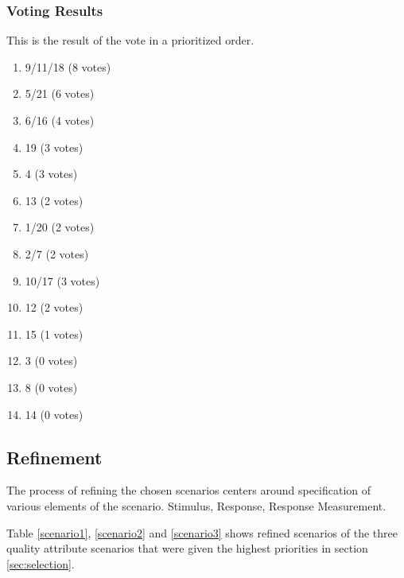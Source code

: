 \documentclass[a4paper,10pt]{article}
\begin{document}
\subsubsection{Voting Results}

This is the result of the vote in a prioritized order.
\begin{enumerate}
\item 9/11/18 (8 votes)
\item 5/21 (6 votes)
\item 6/16 (4 votes)
\item 19 (3 votes)
\item 4 (3 votes)
\item 13 (2 votes)
\item 1/20 (2 votes)
\item 2/7 (2 votes)
\item 10/17 (3 votes)
\item 12 (2 votes)
\item 15 (1 votes)
\item 3 (0 votes)
\item 8 (0 votes)
\item 14 (0 votes)
\end{enumerate}


\subsection{Refinement}
\label{sec:refinement}

The process of refining the chosen scenarios centers around specification of various elements of the scenario. Stimulus, Response, Response Measurement. 

Table \ref{scenario1}, \ref{scenario2} and \ref{scenario3} shows refined scenarios of the three
quality attribute scenarios that were given the highest priorities in section \ref{sec:selection}.
\end{document}
